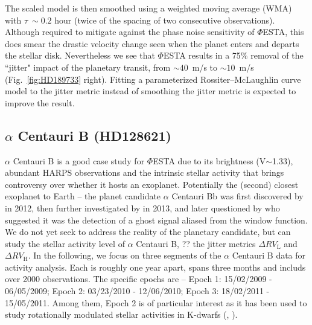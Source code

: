 The scaled model is then smoothed using a weighted moving average (WMA) with $\tau~\sim0.2$ hour (twice of the spacing of two consecutive observations). Although required to mitigate against the phase noise sensitivity of $\mathit{\Phi}$ESTA, this does smear the drastic velocity change seen when the planet enters and departs the stellar disk. Nevertheless we see that $\mathit{\Phi}$ESTA results in a 75\% removal of the ``jitter" impact of the planetary transit, from $\sim 40$~m/s to $\sim 10$~m/s (Fig.~\ref{fig:HD189733} right). Fitting a parameterized Rossiter–McLaughlin curve model to the jitter metric instead of smoothing the jitter metric is expected to improve the result.


%
%

\subsection{$\alpha$ Centauri B (HD128621)}

$\alpha$ Centauri B is a good case study for $\mathit{\Phi}$ESTA due to its brightness (V$\sim$1.33), abundant HARPS observations and the intrinsic stellar activity that brings controversy over whether it hosts an exoplanet. Potentially the (second) closest exoplanet to Earth -- the planet candidate $\alpha$ Centauri Bb was first discovered by \cite{Dumusque_Centauri_B} in 2012, then further investigated by \cite{Hatzes2013} in 2013, and later questioned by \cite{Rajpaul_Alpha_Cen_B} who suggested it was the detection of a ghost signal aliased from the window function. We do not yet seek to address the reality of the planetary candidate, but can study the stellar activity level of $\alpha$ Centauri B, ?? the jitter metrics $\Delta RV_\text{L}$ and $\Delta RV_\text{H}$. In the following, we focus on three segments of the $\alpha$ Centauri B data for activity analysis. Each is roughly one year apart, spans three months and includs over 2000 observations. The specific epochs are -- Epoch 1: 15/02/2009 - 06/05/2009; Epoch 2: 03/23/2010 - 12/06/2010; Epoch 3: 18/02/2011 - 15/05/2011. Among them, Epoch 2 is of particular interest as it has been used to study rotationally modulated stellar activities in K-dwarfs (\cite{Thompson2017MNRAS}, \cite{Wise2018}). 

